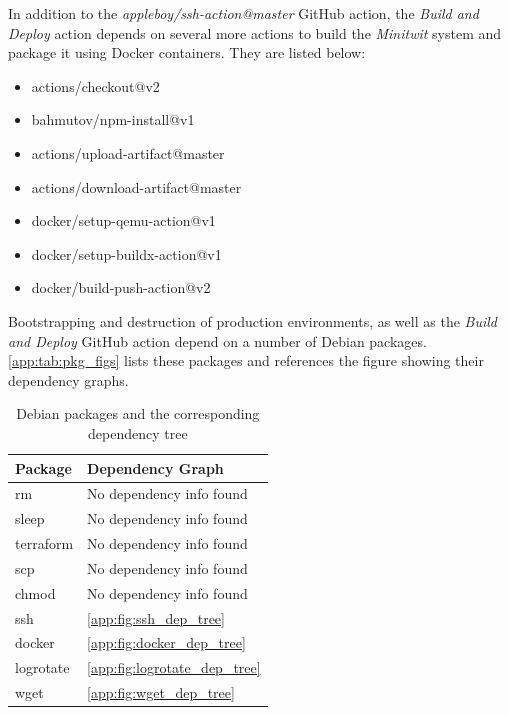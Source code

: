 In addition to the \textit{appleboy/ssh-action@master} GitHub action, the \textit{Build and Deploy} action depends on several more actions to build the \textit{Minitwit} system and package it using Docker containers.
They are listed below:
\begin{itemize}
    \item actions/checkout@v2
    \item bahmutov/npm-install@v1
    \item actions/upload-artifact@master
    \item actions/download-artifact@master
    \item docker/setup-qemu-action@v1
    \item docker/setup-buildx-action@v1
    \item docker/build-push-action@v2
\end{itemize}

Bootstrapping and destruction of production environments, as well as the \textit{Build and Deploy} GitHub action depend on a number of Debian packages. 
\autoref{app:tab:pkg_figs} lists  these packages and references the figure showing their dependency graphs.

\begin{table}[H]
    \centering
     \begin{tabular}{ |l|l| } 
        \hline
        Package & Dependency Graph \\
        \hline
        rm & No dependency info found \\
        \hline
        sleep & No dependency info found \\
        \hline
        terraform & No dependency info found \\
        \hline
        scp & No dependency info found \\
        \hline
        chmod & No dependency info found \\
        \hline
        ssh & \autoref{app:fig:ssh_dep_tree} \\
        \hline
        docker & \autoref{app:fig:docker_dep_tree} \\
        \hline
        logrotate & \autoref{app:fig:logrotate_dep_tree} \\
        \hline
        wget & \autoref{app:fig:wget_dep_tree} \\
        \hline
    \end{tabular}
    \caption{Debian packages and the corresponding dependency tree}
    \label{app:tab:pkg_figs}
\end{table}

